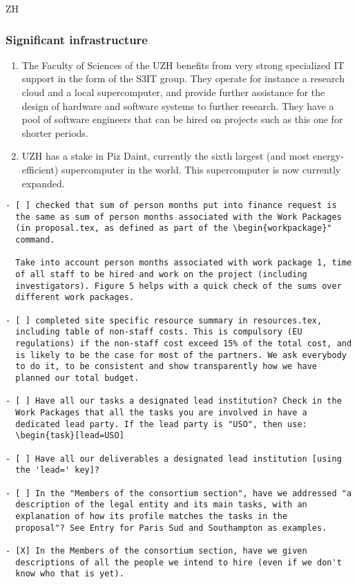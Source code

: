 \begin{sitedescription}{ZH}
\subsubsection*{Significant infrastructure}
\begin{enumerate}
\item The Faculty of Sciences of the UZH benefits from very strong specialized IT support in the form of the S3IT group. They operate for instance a research cloud and a local supercomputer,  and provide further assistance for the design of hardware and software systems to further research. They have a pool of software engineers that can be hired on projects such as this one for shorter periods.
\item UZH has a stake in Piz Daint, currently the sixth largest (and most energy-efficient) supercomputer in the world. This supercomputer is now currently expanded. 
\end{enumerate}
\end{sitedescription}


\begin{draft}
\vspace{1cm}

\begin{verbatim}
- [ ] checked that sum of person months put into finance request is
  the same as sum of person months associated with the Work Packages
  (in proposal.tex, as defined as part of the \begin{workpackage}"
  command.
  
  Take into account person months associated with work package 1, time
  of all staff to be hired and work on the project (including
  investigators). Figure 5 helps with a quick check of the sums over
  different work packages.

- [ ] completed site specific resource summary in resources.tex,
  including table of non-staff costs. This is compulsory (EU
  regulations) if the non-staff cost exceed 15% of the total cost, and
  is likely to be the case for most of the partners. We ask everybody
  to do it, to be consistent and show transparently how we have
  planned our total budget.

- [ ] Have all our tasks a designated lead institution? Check in the
  Work Packages that all the tasks you are involved in have a
  dedicated lead party. If the lead party is "USO", then use:
  \begin{task}[lead=USO]

- [ ] Have all our deliverables a designated lead institution [using
  the 'lead=' key]?

- [ ] In the "Members of the consortium section", have we addressed "a
  description of the legal entity and its main tasks, with an
  explanation of how its profile matches the tasks in the
  proposal"? See Entry for Paris Sud and Southampton as examples.

- [X] In the Members of the consortium section, have we given
  descriptions of all the people we intend to hire (even if we don't
  know who that is yet). 
\end{verbatim}
\end{draft}

